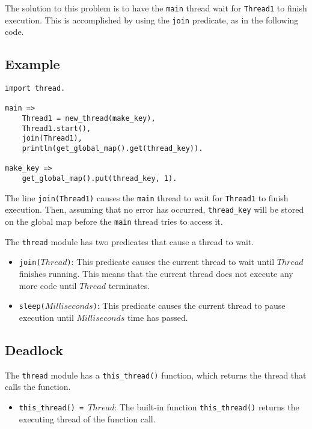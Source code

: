 The solution to this problem is to have the \texttt{main} thread wait for \texttt{Thread1} to finish execution.  This is accomplished by using the \texttt{join} predicate, as in the following code.

\subsection*{Example}
\begin{verbatim}
import thread.

main =>
    Thread1 = new_thread(make_key),
    Thread1.start(),
    join(Thread1),
    println(get_global_map().get(thread_key)).

make_key =>
    get_global_map().put(thread_key, 1).
\end{verbatim}

The line \texttt{join(Thread1)} causes the \texttt{main} thread to wait for \texttt{Thread1} to finish execution.  Then, assuming that no error has occurred, \texttt{thread\_key} will be stored on the global map before the \texttt{main} thread tries to access it.

The \texttt{thread} module has two predicates that cause a thread to wait.

\begin{itemize}
\item \texttt{join($Thread$)}: This predicate causes the current thread to wait until $Thread$ finishes running.  This means that the current thread does not execute any more code until $Thread$ terminates.
\item \texttt{sleep($Milliseconds$)}: This predicate causes the current thread to pause execution until $Milliseconds$ time has passed.
\end{itemize}

\subsection{Deadlock}
The \texttt{thread} module has a \texttt{this\_thread()} function, which returns the thread that calls the function.

\begin{itemize}
\item \texttt{this\_thread() = $Thread$}: The built-in function \texttt{this\_thread()} returns the executing thread of the function call. 
\end{itemize}

